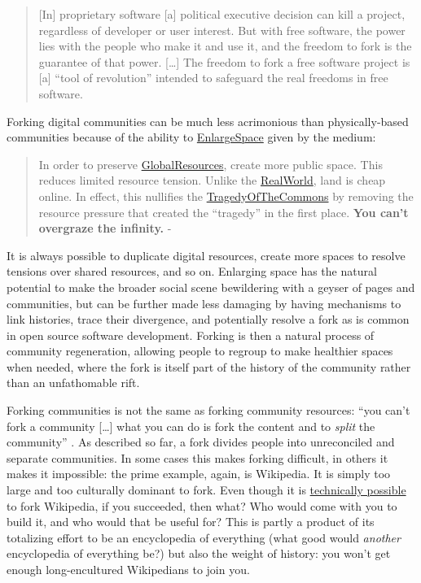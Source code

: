 \documentclass[10pt]{tufte-book}
\begin{document}
\begin{quote}
{[}In{]} proprietary software {[}a{]} political executive decision can
kill a project, regardless of developer or user interest. But with free
software, the power lies with the people who make it and use it, and the
freedom to fork is the guarantee of that power. {[}\ldots{]} The freedom
to fork a free software project is {[}a{]} ``tool of revolution''
intended to safeguard the real freedoms in free software. \citep{hancockOpenOfficeOrgDead2010} 
\end{quote}

Forking digital communities can be much less acrimonious than
physically-based communities because of the ability to
\href{http://meatballwiki.org/wiki/EnlargeSpace}{EnlargeSpace} given by
the medium:

\begin{quote}
In order to preserve
\href{http://meatballwiki.org/wiki/GlobalResource}{GlobalResources},
create more public space. This reduces limited resource tension. Unlike
the \href{http://meatballwiki.org/wiki/RealWorld}{RealWorld}, land is
cheap online. In effect, this nullifies the
\href{http://meatballwiki.org/wiki/GlobalResource}{TragedyOfTheCommons}
by removing the resource pressure that created the ``tragedy'' in the
first place. \textbf{You can't overgraze the infinity.} - \citep{MeatballWikiEnlargeSpace} 
\end{quote}

It is always possible to duplicate digital resources, create more spaces
to resolve tensions over shared resources, and so on. Enlarging space
has the natural potential to make the broader social scene bewildering
with a geyser of pages and communities, but can be further made less
damaging by having mechanisms to link histories, trace their divergence,
and potentially resolve a fork as is common in open source software
development. Forking is then a natural process of community
regeneration, allowing people to regroup to make healthier spaces when
needed, where the fork is itself part of the history of the community
rather than an unfathomable rift.

Forking communities is not the same as forking community resources:
``you can't fork a community {[}\ldots{]} what you can do is fork the
content and to \emph{split} the community'' \citep{MeatballWikiForkingOfOnlineCommunitiesa} . As described so far, a
fork divides people into unreconciled and separate communities. In some
cases this makes forking difficult, in others it makes it impossible:
the prime example, again, is Wikipedia. It is simply too large and too
culturally dominant to fork. Even though it is
\href{https://en.wikipedia.org/wiki/Wikipedia:FAQ/Forking\#Am_I_allowed_to_fork_Wikipedia?}{technically
possible} to fork Wikipedia, if you succeeded, then what? Who would come
with you to build it, and who would that be useful for? This is partly a
product of its totalizing effort to be an encyclopedia of everything
(what good would \emph{another} encyclopedia of everything be?) but also
the weight of history: you won't get enough long-encultured Wikipedians
to join you.
\end{document}
